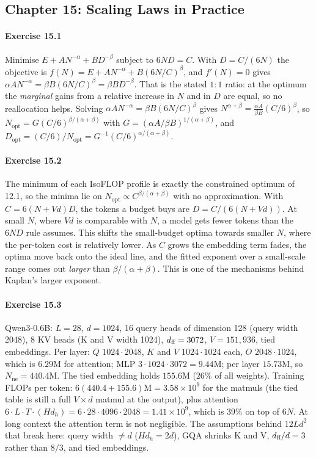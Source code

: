 \subsection*{Chapter 15: Scaling Laws in Practice}

\paragraph{Exercise 15.1} Minimise $E+AN^{-\alpha}+BD^{-\beta}$ subject to $6ND=C$. With
$D=C/(6N)$ the objective is $f(N)=E+AN^{-\alpha}+B(6N/C)^{\beta}$, and $f'(N)=0$ gives
$\alpha AN^{-\alpha}=\beta B(6N/C)^{\beta}=\beta BD^{-\beta}$. That is the stated $1:1$ ratio:
at the optimum the \emph{marginal} gains from a relative increase in $N$ and in $D$ are equal, so
no reallocation helps. Solving $\alpha AN^{-\alpha}=\beta B(6N/C)^{\beta}$ gives
$N^{\alpha+\beta}=\frac{\alpha A}{\beta B}(C/6)^{\beta}$, so
$N_{\text{opt}}=G(C/6)^{\beta/(\alpha+\beta)}$ with $G=(\alpha A/\beta B)^{1/(\alpha+\beta)}$, and
$D_{\text{opt}}=(C/6)/N_{\text{opt}}=G^{-1}(C/6)^{\alpha/(\alpha+\beta)}$.

\paragraph{Exercise 15.2} The minimum of each IsoFLOP profile is exactly the constrained optimum
of 12.1, so the minima lie on $N_{\text{opt}}\propto C^{\beta/(\alpha+\beta)}$ with no
approximation. With $C=6(N+Vd)D$, the tokens a budget buys are $D=C/(6(N+Vd))$. At small $N$,
where $Vd$ is comparable with $N$, a model gets fewer tokens than the $6ND$ rule assumes. This
shifts the small-budget optima towards smaller $N$, where the per-token cost is relatively lower.
As $C$ grows the embedding term fades, the optima move back onto the ideal line, and the fitted
exponent over a small-scale range comes out \emph{larger} than $\beta/(\alpha+\beta)$. This is one of
the mechanisms behind Kaplan's larger exponent.

\paragraph{Exercise 15.3} Qwen3-0.6B: $L=28$, $d=1024$, 16 query heads of dimension 128 (query
width 2048), 8 KV heads (K and V width 1024), $d_{\text{ff}}=3072$, $V=151{,}936$, tied embeddings. Per
layer: $Q$ $1024\cdot2048$, $K$ and $V$ $1024\cdot1024$ each, $O$ $2048\cdot1024$, which is
$6.29$M for attention; MLP $3\cdot1024\cdot3072=9.44$M; per layer $15.73$M, so
$N_{\text{ne}}=440.4$M. The tied embedding holds $155.6$M ($26\%$ of all weights). Training FLOPs per
token: $6(440.4+155.6)\text{M}=3.58\times10^9$ for the matmuls (the tied table is still a full
$V\times d$ matmul at the output), plus attention $6\cdot L\cdot T\cdot(Hd_h)=6\cdot28\cdot4096\cdot2048
=1.41\times10^9$, which is 39\% on top of $6N$. At long context the attention term is not
negligible. The assumptions behind $12Ld^2$ that break here: query width $\neq d$
($Hd_h=2d$), GQA shrinks K and V, $d_{\text{ff}}/d=3$ rather than $8/3$, and tied embeddings.


